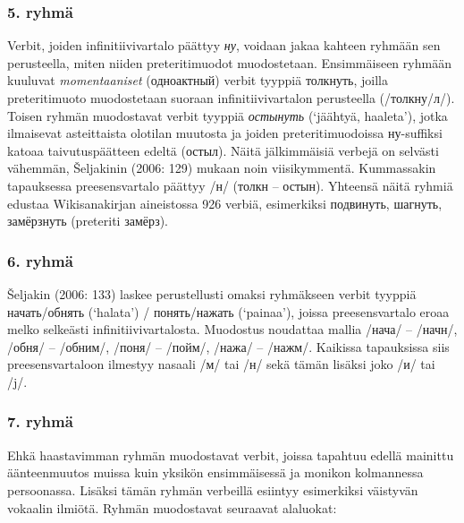 \documentclass[]{scrartcl}
\begin{document}
\subsubsection{5. ryhmä}\label{ryhmuxe4-4}

Verbit, joiden infinitiivivartalo päättyy \emph{ну}, voidaan jakaa
kahteen ryhmään sen perusteella, miten niiden preteritimuodot
muodostetaan. Ensimmäiseen ryhmään kuuluvat \emph{momentaaniset}
(одноактный) verbit tyyppiä толкнуть, joilla preteritimuoto muodostetaan
suoraan infinitiivivartalon perusteella (/толкну/л/). Toisen ryhmän
muodostavat verbit tyyppiä \emph{остынуть} (`jäähtyä, haaleta'), jotka
ilmaisevat asteittaista olotilan muutosta ja joiden preteritimuodoissa
ну-suffiksi katoaa taivutuspäätteen edeltä (остыл). Näitä jälkimmäisiä
verbejä on selvästi vähemmän, Šeljakinin (2006: 129) mukaan noin
viisikymmentä. Kummassakin tapauksessa preesensvartalo päättyy /н/
(толкн -- остын). Yhteensä näitä ryhmiä edustaa Wikisanakirjan
aineistossa 926 verbiä, esimerkiksi подвинуть, шагнуть, замёрзнуть
(preteriti замёрз).

\subsubsection{6. ryhmä}\label{ryhmuxe4-5}

Šeljakin (2006: 133) laskee perustellusti omaksi ryhmäkseen verbit
tyyppiä начать/обнять (`halata') / понять/нажать (`painaa'), joissa
preesensvartalo eroaa melko selkeästi infinitiivivartalosta. Muodostus
noudattaa mallia /нача/ -- /начн/, /обня/ -- /обним/, /поня/ -- /пойм/,
/нажа/ -- /нажм/. Kaikissa tapauksissa siis preesensvartaloon ilmestyy
nasaali /м/ tai /н/ sekä tämän lisäksi joko /и/ tai /j/.

\subsubsection{7. ryhmä}\label{ryhmuxe4-6}

Ehkä haastavimman ryhmän muodostavat verbit, joissa tapahtuu edellä
mainittu äänteenmuutos muissa kuin yksikön ensimmäisessä ja monikon
kolmannessa persoonassa. Lisäksi tämän ryhmän verbeillä esiintyy
esimerkiksi väistyvän vokaalin ilmiötä. Ryhmän muodostavat seuraavat
alaluokat:
\end{document}
